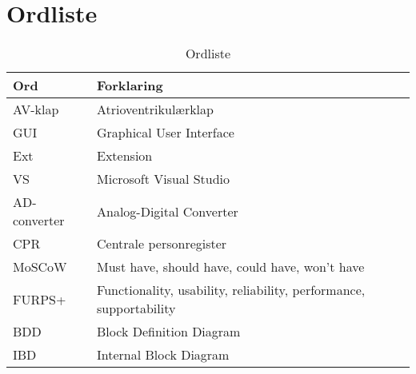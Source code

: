 \chapter{Ordliste}

\begin{table}[h!]
	\begin{tabular}{l|l}
		\textbf{Ord} & \textbf {Forklaring} \\ 
		\hline
		AV-klap & Atrioventrikulærklap \\
		\hline
		GUI & Graphical User Interface \\
		\hline
		Ext & Extension \\
		\hline
		VS & Microsoft Visual Studio \\
		\hline
		AD-converter & Analog-Digital Converter \\
		\hline
		CPR & Centrale personregister \\
		\hline
		MoSCoW & Must have, should have, could have, won't have \\
		\hline
		FURPS+ & Functionality, usability, reliability, performance, supportability \\
		\hline
		BDD & Block Definition Diagram \\
		\hline
		IBD & Internal Block Diagram \\
		\hline
	\end{tabular}
\caption{Ordliste}
\label{table:Ordliste}
\end{table}

